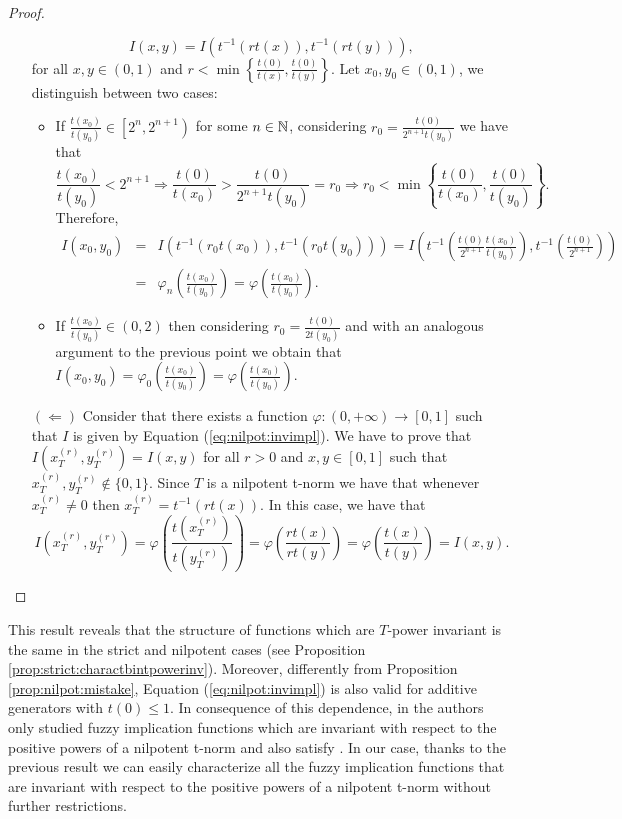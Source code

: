 \begin{proof}
\begin{itemize}
		$$I(x,y)= I(t^{-1}(rt(x)),t^{-1}(rt(y))),$$
		for all $x,y \in (0,1)$ and $r < \min \left\lbrace\frac{t(0)}{t(x)},\frac{t(0)}{t(y)}\right\rbrace$. Let $x_0,y_0 \in (0,1)$, we distinguish between two cases:
		\begin{itemize}
			\item If $\frac{t(x_0)}{t(y_0)} \in \left[2^n,2^{n+1}\right)$ for some $n \in \mathbb{N}$, considering $r_0= \frac{t(0)}{2^{n+1}t(y_0)}$ we have that
			$$\frac{t(x_0)}{t(y_0)}< 2^{n+1} \Rightarrow \frac{t(0)}{t(x_0)} > \frac{t(0)}{2^{n+1}t(y_0)} =r_0 \Rightarrow r_0 < \min \left\lbrace\frac{t(0)}{t(x_0)},\frac{t(0)}{t(y_0)}\right\rbrace.$$
			Therefore, 
			\begin{eqnarray*}
				I(x_0,y_0)&=&I(t^{-1}(r_0t(x_0)),t^{-1}(r_0t(y_0)))=I\left(t^{-1}\left(\frac{t(0)}{2^{n+1}}\frac{t(x_0)}{t(y_0)}\right),t^{-1}\left(\frac{t(0)}{2^{n+1}}\right)\right) \\
				&=&\varphi_n\left(\frac{t(x_0)}{t(y_0)}\right) = \varphi \left(\frac{t(x_0)}{t(y_0)}\right).
			\end{eqnarray*}
			\item If $\frac{t(x_0)}{t(y_0)} \in \left(0,2\right)$ then considering $r_0= \frac{t(0)}{2t(y_0)}$ and with an analogous argument to the previous point we obtain that $I(x_0,y_0)=\varphi_0\left(\frac{t(x_0)}{t(y_0)}\right)=\varphi\left(\frac{t(x_0)}{t(y_0)}\right)$.
		\end{itemize}
		\item[$(\Leftarrow)$] Consider that there exists a function $\varphi:(0,+\infty) \to [0,1]$ such that $I$ is given by Equation (\ref{eq:nilpot:invimpl}). We have to prove that $I(x_T^{(r)},y_T^{(r)})=I(x,y)$ for all $r>0$ and $x,y \in [0,1]$ such that $x_T^{(r)},y_T^{(r)} \not \in \{0,1\}$. Since $T$ is a nilpotent t-norm we have that whenever $x_T^{(r)} \not = 0$ then $x_T^{(r)}=t^{-1}(rt(x))$. In this case, we have that
		$$I(x_T^{(r)},y_T^{(r)})=\varphi \left(\frac{t(x_T^{(r)})}{t(y_T^{(r)})}\right)
		=\varphi \left(\frac{rt(x)}{rt(y)}\right) =\varphi \left(\frac{t(x)}{t(y)}\right)=I(x,y).$$
	\end{itemize}
\end{proof}

This result reveals that the structure of functions which are $T$-power invariant is the same in the strict and nilpotent cases (see Proposition \ref{prop:strict:charactbintpowerinv}). Moreover, differently from Proposition \ref{prop:nilpot:mistake}, Equation (\ref{eq:nilpot:invimpl}) is also valid for additive generators with $t(0) \leq 1$. In consequence of this dependence, in \cite{Massanet2019B} the authors only studied fuzzy implication functions which are invariant with respect to the positive powers of a nilpotent t-norm and also satisfy \IP. In our case, thanks to the previous result we can easily characterize all the fuzzy implication functions that are invariant with respect to the positive powers of a nilpotent t-norm without further restrictions.

